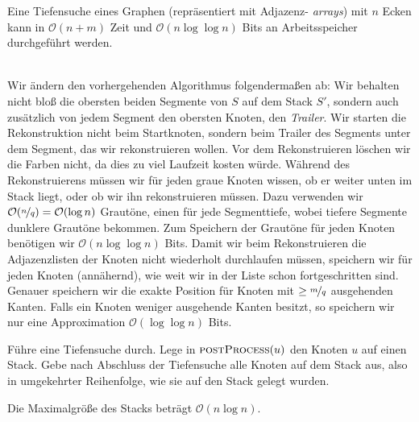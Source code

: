 \documentclass{cheat-sheet}
\renewcommand{\O}{\mathcal{O}} %
\begin{document}

\begin{thm}
  Eine Tiefensuche eines Graphen (repräsentiert mit Adjazenz- \textit{arrays}) mit $n$ Ecken kann in $\O(n+m)$ Zeit und $\O(n \log \log n)$ Bits an Arbeitsspeicher durchgeführt werden.
\end{thm}

\begin{alg} \mbox{}\\
  Wir ändern den vorhergehenden Algorithmus folgendermaßen ab:
  Wir behalten nicht bloß die obersten beiden Segmente von $S$ auf dem Stack $S'$, sondern auch zusätzlich von jedem Segment den obersten Knoten, den \textit{Trailer}.
  Wir starten die Rekonstruktion nicht beim Startknoten, sondern beim Trailer des Segments unter dem Segment, das wir rekonstruieren wollen.
  Vor dem Rekonstruieren löschen wir die Farben nicht, da dies zu viel Laufzeit kosten würde.
  Während des Rekonstruierens müssen wir für jeden graue Knoten wissen, ob er weiter unten im Stack liegt, oder ob wir ihn rekonstruieren müssen.
  Dazu verwenden wir $\O(\nicefrac{n}{q}) = \O(\log n)$ Grautöne, einen für jede Segmenttiefe, wobei tiefere Segmente dunklere Grautöne bekommen.
  Zum Speichern der Grautöne für jeden Knoten benötigen wir $\O(n \log \log n)$ Bits.
  Damit wir beim Rekonstruieren die Adjazenzlisten der Knoten nicht wiederholt durchlaufen müssen, speichern wir für jeden Knoten (annähernd), wie weit wir in der Liste schon fortgeschritten sind.
  Genauer speichern wir die exakte Position für Knoten mit $\geq \nicefrac{m}{q}$ ausgehenden Kanten.
  Falls ein Knoten weniger ausgehende Kanten besitzt, so speichern wir nur eine Approximation $\O(\log \log n)$ Bits.
\end{alg}



\begin{alg}
  Führe eine Tiefensuche durch.
  Lege in $\Call{postProcess}{u}$ den Knoten $u$ auf einen Stack.
  Gebe nach Abschluss der Tiefensuche alle Knoten auf dem Stack aus, also in umgekehrter Reihenfolge, wie sie auf den Stack gelegt wurden.
\end{alg}

\begin{problem}
  Die Maximalgröße des Stacks beträgt $\O(n \log n)$.
\end{problem}
\end{document}
